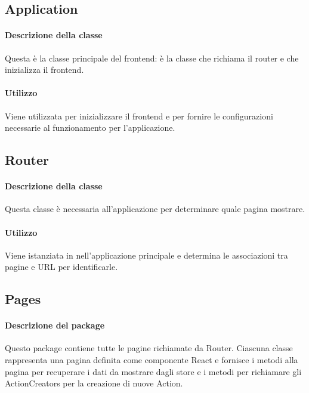 \subsection{Application}
\paragraph*{Descrizione della classe}
Questa è la classe principale del frontend: è la classe che richiama il router e che inizializza il frontend.
\paragraph*{Utilizzo}
Viene utilizzata per inizializzare il frontend e per fornire le configurazioni necessarie al funzionamento per l'applicazione.

\subsection{Router}
\paragraph*{Descrizione della classe}
Questa classe è necessaria all'applicazione per determinare quale pagina mostrare.
\paragraph*{Utilizzo}
Viene istanziata in nell'applicazione principale e determina le associazioni tra pagine e URL per identificarle.

\subsection{Pages}
\paragraph*{Descrizione del package}
Questo package contiene tutte le pagine richiamate da Router. Ciascuna classe rappresenta una pagina definita come componente React e fornisce i metodi alla pagina per recuperare i dati da mostrare dagli store e i metodi per richiamare gli ActionCreators per la creazione di nuove Action.

